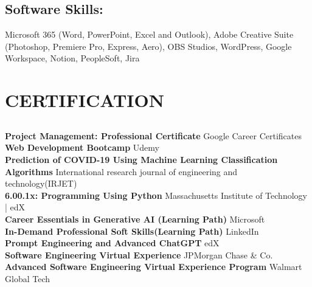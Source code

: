 \documentclass[a4paper]{deedy-resume} %
\begin{document}
\begin{minipage}[t]{0.33\textwidth}
\sectionspace %



\subsection{Software Skills: }

Microsoft 365 (Word, PowerPoint, Excel and Outlook), 
Adobe Creative Suite (Photoshop, Premiere Pro, Express, Aero),
OBS Studios, WordPress, Google Workspace, Notion, PeopleSoft, Jira


\sectionspace %


\section{CERTIFICATION}




\subsection{}


\textbf{Project Management: Professional Certificate} \textbullet{} Google Career Certificates \\
\textbf{Web Development Bootcamp} \textbullet{} Udemy  \\
\textbf{Prediction of COVID-19 Using Machine Learning Classification Algorithms} \textbullet{} International research journal of engineering and technology(IRJET)  \\
\textbf{6.00.1x: Programming Using Python} \textbullet{} Massachusetts Institute of Technology | edX\\
\textbf{Career Essentials in Generative AI (Learning Path)} \textbullet{} Microsoft \\
\textbf{In-Demand Professional Soft Skills(Learning Path)} \textbullet{} LinkedIn \\
\textbf{Prompt Engineering and Advanced ChatGPT} \textbullet{} edX \\
\textbf{Software Engineering Virtual Experience} \textbullet{} JPMorgan Chase & Co.\\
\textbf{Advanced Software Engineering Virtual Experience Program} \textbullet{} Walmart Global Tech \\


\sectionspace %






\end{minipage} %
\end{document}
